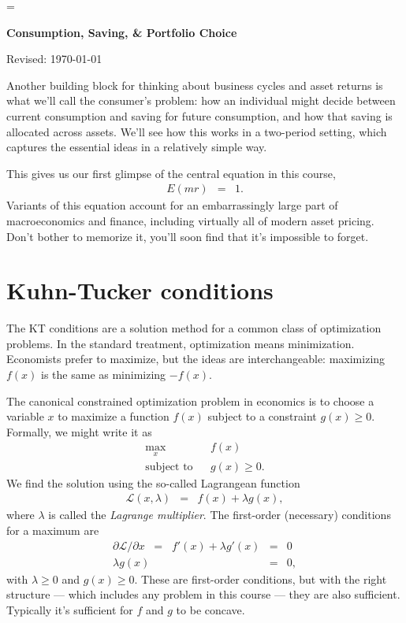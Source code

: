 \documentclass[11pt]{article}
\begin{document}
\parskip=\bigskipamount
\parindent=0.0in
\thispagestyle{empty}


\bigskip\bigskip
\centerline{\Large \bf Consumption, Saving, \& Portfolio Choice}
\centerline{Revised: \today}

\medskip
Another building block for thinking about business cycles
and asset returns is what we'll call the consumer's problem:
how an individual might decide between current consumption
and saving for future consumption,
and how that saving is allocated across assets.
We'll see how this works in a two-period setting,
which captures the essential ideas in a relatively simple way.

This gives us our first glimpse of the central equation in this course,
\begin{eqnarray}
    E (mr) &=& 1 .
    \label{eq:E(mr)=1}
\end{eqnarray}
Variants of this equation account for
an embarrassingly large part of macroeconomics and finance,
including virtually all of modern asset pricing.
Don't bother to memorize it,
you'll soon find that it's impossible to forget.


\section{Kuhn-Tucker conditions}

The KT conditions are a solution method for a common class of optimization problems.
In the standard treatment, optimization means minimization.
Economists prefer to maximize, but the ideas are interchangeable:
maximizing $f(x)$ is the same as minimizing $-f(x)$.

The canonical constrained optimization problem in economics
is to choose a variable $x$ to maximize a function
$f(x)$ subject to a constraint $g(x) \geq 0$.
Formally, we might write it as
\begin{eqnarray*}
    \max_x && f(x) \\
    \mbox{subject to} && g(x) \geq 0 .
\end{eqnarray*}
We find the solution using the so-called Lagrangean function
\begin{eqnarray*}
    \mathcal{L}(x,\lambda) &=& f(x) + \lambda g(x) ,
\end{eqnarray*}
where $\lambda$ is called the {\it Lagrange multiplier\/}.
The first-order (necessary) conditions for a maximum are
\begin{eqnarray*}
   \partial \mathcal{L}/\partial x \;\;=\;\; f'(x) + \lambda g'(x) &=&  0 \\
   \lambda g(x) &=& 0 ,
\end{eqnarray*}
with  $\lambda \geq 0$ and $g(x) \geq 0$.
These are first-order conditions,
but with the right structure --- which includes any problem in this course ---
they are also sufficient.
Typically it's sufficient for $f$ and $g$ to be concave.
\end{document}
